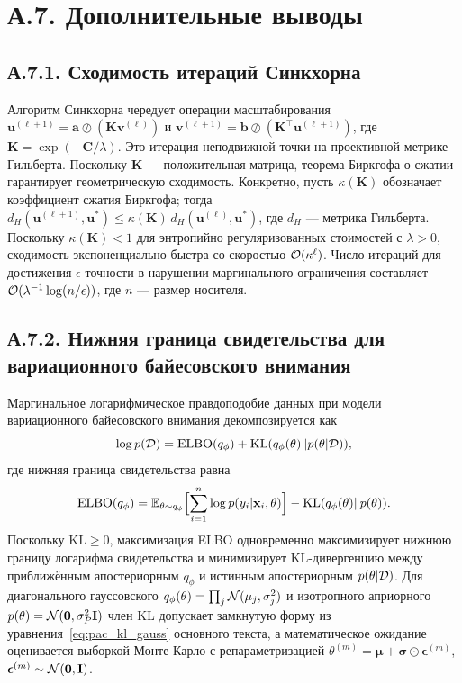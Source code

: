 \section*{А.7. Дополнительные выводы}
\label{app:additional}

\subsection*{А.7.1. Сходимость итераций Синкхорна}
\label{app:sinkhorn}

Алгоритм Синкхорна чередует операции масштабирования $\mathbf{u}^{(\ell+1)}=\mathbf{a}\oslash(\mathbf{K}\mathbf{v}^{(\ell)})$ и $\mathbf{v}^{(\ell+1)}=\mathbf{b}\oslash(\mathbf{K}^\top\mathbf{u}^{(\ell+1)})$, где $\mathbf{K}=\exp(-\mathbf{C}/\lambda)$. Это итерация неподвижной точки на проективной метрике Гильберта. Поскольку $\mathbf{K}$ --- положительная матрица, теорема Биркгофа о сжатии гарантирует геометрическую сходимость. Конкретно, пусть $\kappa(\mathbf{K})$ обозначает коэффициент сжатия Биркгофа; тогда $d_H(\mathbf{u}^{(\ell+1)},\mathbf{u}^*)\le\kappa(\mathbf{K})\,d_H(\mathbf{u}^{(\ell)},\mathbf{u}^*)$, где $d_H$ --- метрика Гильберта. Поскольку $\kappa(\mathbf{K})<1$ для энтропийно регуляризованных стоимостей с $\lambda>0$, сходимость экспоненциально быстра со скоростью $\mathcal{O}(\kappa^{\ell})$. Число итераций для достижения $\epsilon$-точности в нарушении маргинального ограничения составляет $\mathcal{O}(\lambda^{-1}\log(n/\epsilon))$, где $n$ --- размер носителя.


\subsection*{А.7.2. Нижняя граница свидетельства для вариационного байесовского внимания}
\label{app:elbo}

Маргинальное логарифмическое правдоподобие данных при модели вариационного байесовского внимания декомпозируется как
\begin{equation}
\log p(\mathcal{D}) = \mathrm{ELBO}(q_\phi) + \mathrm{KL}(q_\phi(\theta)\|p(\theta|\mathcal{D})),
\end{equation}
где нижняя граница свидетельства равна
\begin{equation}
\mathrm{ELBO}(q_\phi) = \mathbb{E}_{\theta\sim q_\phi}\Bigl[\sum_{i=1}^n\log p(y_i|\mathbf{x}_i,\theta)\Bigr] - \mathrm{KL}(q_\phi(\theta)\|p(\theta)).
\end{equation}
Поскольку $\mathrm{KL}\ge 0$, максимизация ELBO одновременно максимизирует нижнюю границу логарифма свидетельства и минимизирует KL-дивергенцию между приближённым апостериорным $q_\phi$ и истинным апостериорным $p(\theta|\mathcal{D})$. Для диагонального гауссовского $q_\phi(\theta)=\prod_j\mathcal{N}(\mu_j,\sigma_j^2)$ и изотропного априорного $p(\theta)=\mathcal{N}(\mathbf{0},\sigma_P^2\mathbf{I})$ член KL допускает замкнутую форму из уравнения~\eqref{eq:pac_kl_gauss} основного текста, а математическое ожидание оценивается выборкой Монте-Карло с репараметризацией $\theta^{(m)}=\bm{\mu}+\bm{\sigma}\odot\bm{\epsilon}^{(m)}$, $\bm{\epsilon}^{(m)}\sim\mathcal{N}(\mathbf{0},\mathbf{I})$.


